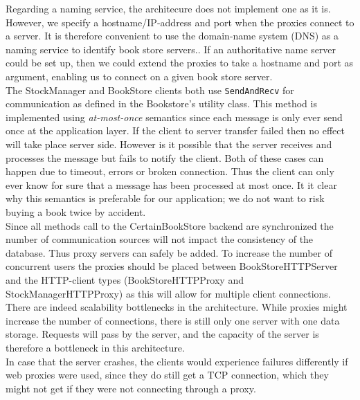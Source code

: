 \documentclass[11pt]{article}
\begin{document}
Regarding a naming service, the architecure does not implement one as it is.
However, we specify a hostname/IP-address and port when the proxies connect
to a server. It is therefore convenient to use the domain-name system
(DNS) as a naming service to identify book store servers.. If an authoritative
name server could be set up, then we could extend the proxies to take a
hostname and port as argument, enabling us to connect on a given book store
server.\\


The StockManager and BookStore clients both use \texttt{SendAndRecv} for communication as defined in the Bookstore’s utility class. This method is implemented using \emph{at-most-once} semantics since each message is only ever send once at the application layer. If the client to server transfer failed then no effect will take place server side. However is it possible that the server receives and processes the message but fails to notify the client. Both of these cases can happen due to timeout, errors or broken connection. Thus the client can only ever know for sure that a message has been processed at most once. It it
clear why this semantics is preferable for our application; we do not want to risk buying
a book twice by accident.\\



Since all methods call to the CertainBookStore backend are synchronized the number of communication sources will not impact the consistency of the database. Thus proxy servers can safely be added. To increase the number of concurrent users the proxies should be placed between BookStoreHTTPServer and the HTTP-client types (BookStoreHTTPProxy and StockManagerHTTPProxy) as this will allow for multiple client connections.\\


There are indeed scalability bottlenecks in the architecture. While proxies might increase the number of connections, there is still only one server with one data storage. Requests will pass by the server, and the capacity of the server is therefore a bottleneck in this architecture.\\


In case that the server crashes, the clients would experience failures differently if web proxies were used, since they do still get a TCP connection, which they might not get if they were not connecting through a proxy.\\
\end{document}
